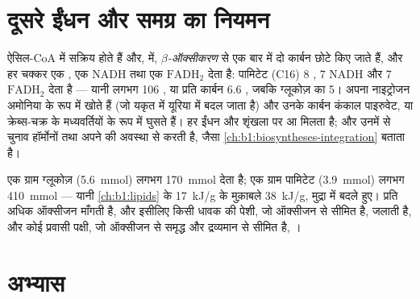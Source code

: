 \section{दूसरे ईंधन और समग्र का नियमन}

\begin{proposition}[वसाएँ और प्रोटीन उसी मशीनरी में घुसते हैं]\label{prop:b1:respiration-fermentation:otherfuels}
 ऐसिल-CoA में सक्रिय होते हैं और,  में, \emph{$\beta$-ऑक्सीकरण} से एक बार में दो कार्बन छोटे किए
जाते हैं, और हर चक्कर एक , एक NADH तथा एक $\mathrm{FADH_2}$
देता है: पामिटेट (C16) 8 , 7 NADH और 7 $\mathrm{FADH_2}$ देता
है --- यानी लगभग 106 , या प्रति कार्बन \qty{6.6}{} , जबकि ग्लूकोज़
का 5।  अपना नाइट्रोजन अमोनिया के रूप में खोते हैं (जो यकृत में
यूरिया में बदल जाता है) और उनके कार्बन कंकाल पाइरुवेट,  या
क्रेब्स-चक्र के मध्यवर्तियों के रूप में घुसते हैं। हर ईंधन  और
शृंखला पर आ मिलता है; और  उनमें से चुनाव हॉर्मोनों तथा अपने  की
अवस्था से करती है, जैसा \cref{ch:b1:biosyntheses-integration} बताता है।
\end{proposition}

\begin{example}[हर एक का एक ग्राम]\label{ex:b1:respiration-fermentation:gramofeach}
एक ग्राम ग्लूकोज़ (\qty{5.6}{mmol}) लगभग \qty{170}{mmol}
 देता है; एक ग्राम पामिटेट (\qty{3.9}{mmol}) लगभग \qty{410}{mmol} ---
यानी \cref{ch:b1:lipids} के \qty{17}{kJ/g} के मुक़ाबले \qty{38}{kJ/g},
मुद्रा में बदले हुए।  प्रति  अधिक ऑक्सीजन माँगती है, और इसीलिए किसी
धावक की पेशी, जो ऑक्सीजन से सीमित है,  जलाती है, और कोई प्रवासी
पक्षी, जो ऑक्सीजन से समृद्ध और द्रव्यमान से सीमित है, ।
\end{example}

\section{अभ्यास}

